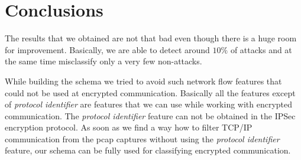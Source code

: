 \documentclass{article}
\begin{document}
\clearpage
\section{Conclusions}
The results that we obtained are not that bad even though there is a huge room for improvement. Basically, we are able to detect around $10\%$ of attacks and at the same time misclassify only a very few non-attacks.

While building the schema we tried to avoid such network flow features that could not be used at encrypted communication. Basically all the features except of \textit{protocol identifier} are features that we can use while working with encrypted communication. The \textit{protocol identifier} feature can not be obtained in the IPSec encryption protocol. As soon as we find a way how to filter TCP/IP communication from the pcap captures without using the \textit{protocol identifier} feature, our schema can be fully used for classifying encrypted communication.



\clearpage




% 







\end{document}

